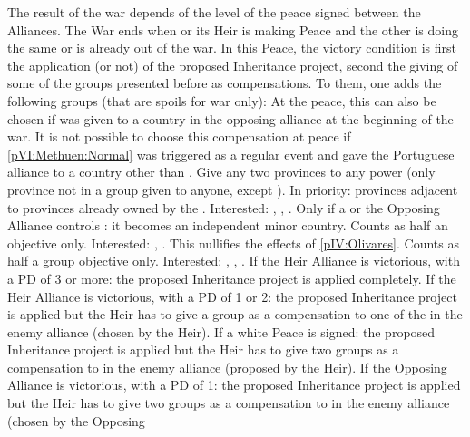\begin{digressions}
  \phpaix
  \aparag The result of the war depends of the level of the peace signed
  between the Alliances. The War ends when \SPA or its Heir is making Peace
  and the other is doing the same or is already out of the war.
  \aparag In this Peace, the victory condition is first the application (or
  not) of the proposed Inheritance project, second the giving of some of the
  groups presented before as compensations. To them, one adds the following
  groups (that are spoils for war only):
   At the peace, this can
  also be chosen if \paysportugal was given to a country in the opposing
  alliance at the beginning of the war. It is not possible to choose this
  compensation at peace if \ref{pVI:Methuen:Normal} was triggered as a regular
  event and gave the Portuguese alliance to a country other than \HIS.
   Give any two provinces to any power (only
  province not in a group given to anyone, except \SPA). In priority:
  provinces adjacent to provinces already owned by the \MAJ.  Interested:
  \FRA, \ENG, \AUS.
   Only if a \REVOLT or the Opposing
  Alliance controls \provinceCatalogne: it becomes an independent minor
  country.  Counts as half an objective only.  Interested: \FRA, \ENG.
   This nullifies the effects of
  \ref{pIV:Olivares}.  Counts as half a group objective only.  Interested:
  \FRA, \ENG, \HOL.
  \aparag If the Heir Alliance is victorious, with a PD of 3 or more: the
  proposed Inheritance project is applied completely.
  \aparag If the Heir Alliance is victorious, with a PD of 1 or 2: the
  proposed Inheritance project is applied but the Heir has to give a group as
  a compensation to one of the \MAJ in the enemy alliance (chosen by the
  Heir).
  \aparag If a white Peace is signed: the proposed Inheritance project is
  applied but the Heir has to give two groups as a compensation to \MAJ in the
  enemy alliance (proposed by the Heir).
  \aparag If the Opposing Alliance is victorious, with a PD of 1: the proposed
  Inheritance project is applied but the Heir has to give two groups as a
  compensation to \MAJ in the enemy alliance (chosen by the Opposing

\end{digressions}
